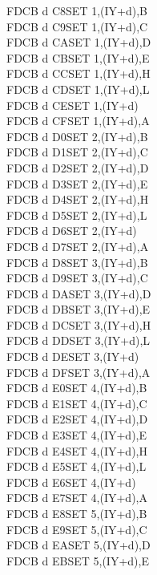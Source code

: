 \begin{multicols}{3}
{\begin{tabbing}
	FDCB d C8\>SET 1,(IY+d),B\UNDOC\\
	FDCB d C9\>SET 1,(IY+d),C\UNDOC\\
	FDCB d CA\>SET 1,(IY+d),D\UNDOC\\
	FDCB d CB\>SET 1,(IY+d),E\UNDOC\\
	FDCB d CC\>SET 1,(IY+d),H\UNDOC\\
	FDCB d CD\>SET 1,(IY+d),L\UNDOC\\
	FDCB d CE\>SET 1,(IY+d)\\
	FDCB d CF\>SET 1,(IY+d),A\UNDOC\\
	FDCB d D0\>SET 2,(IY+d),B\UNDOC\\
	FDCB d D1\>SET 2,(IY+d),C\UNDOC\\
	FDCB d D2\>SET 2,(IY+d),D\UNDOC\\
	FDCB d D3\>SET 2,(IY+d),E\UNDOC\\
	FDCB d D4\>SET 2,(IY+d),H\UNDOC\\
	FDCB d D5\>SET 2,(IY+d),L\UNDOC\\
	FDCB d D6\>SET 2,(IY+d)\\
	FDCB d D7\>SET 2,(IY+d),A\UNDOC\\
	FDCB d D8\>SET 3,(IY+d),B\UNDOC\\
	FDCB d D9\>SET 3,(IY+d),C\UNDOC\\
	FDCB d DA\>SET 3,(IY+d),D\UNDOC\\
	FDCB d DB\>SET 3,(IY+d),E\UNDOC\\
	FDCB d DC\>SET 3,(IY+d),H\UNDOC\\
	FDCB d DD\>SET 3,(IY+d),L\UNDOC\\
	FDCB d DE\>SET 3,(IY+d)\\
	FDCB d DF\>SET 3,(IY+d),A\UNDOC\\
	FDCB d E0\>SET 4,(IY+d),B\UNDOC\\
	FDCB d E1\>SET 4,(IY+d),C\UNDOC\\
	FDCB d E2\>SET 4,(IY+d),D\UNDOC\\
	FDCB d E3\>SET 4,(IY+d),E\UNDOC\\
	FDCB d E4\>SET 4,(IY+d),H\UNDOC\\
	FDCB d E5\>SET 4,(IY+d),L\UNDOC\\
	FDCB d E6\>SET 4,(IY+d)\\
	FDCB d E7\>SET 4,(IY+d),A\UNDOC\\
	FDCB d E8\>SET 5,(IY+d),B\UNDOC\\
	FDCB d E9\>SET 5,(IY+d),C\UNDOC\\
	FDCB d EA\>SET 5,(IY+d),D\UNDOC\\
	FDCB d EB\>SET 5,(IY+d),E\UNDOC\\

\end{tabbing}}
\end{multicols}
